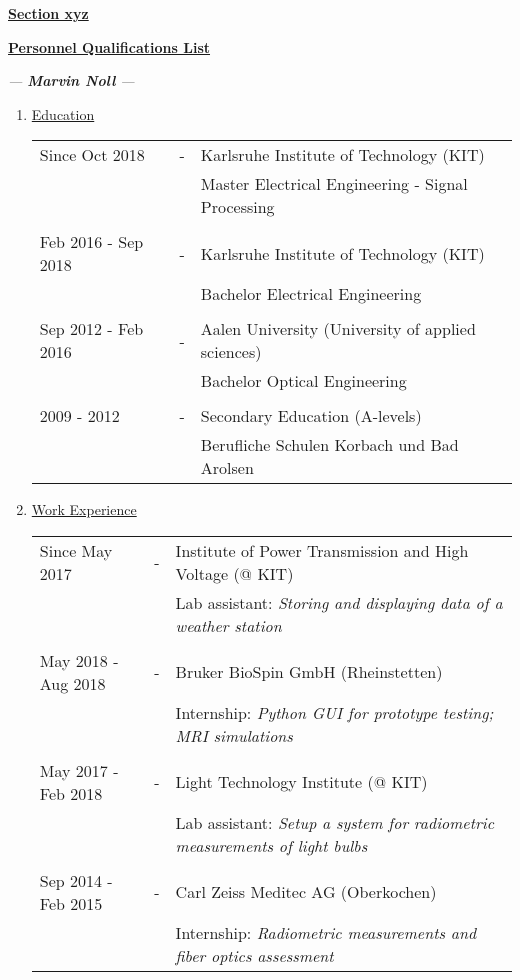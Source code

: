 \documentclass[12pt,a4paper]{scrartcl}
\begin{document}
	

\begin{center}
	\Large\textbf{\underline{Section xyz}}
	
	\vspace{0.5cm}
	
	\Large\textbf{\underline{Personnel Qualifications List}}
	
	\large \textit{--- \textbf{Marvin Noll} ---}
\end{center}


\begin{enumerate}[label=\Alph*.]
	\item \underline{Education}
	
		\begin{tabulary}{\textwidth}{@{}p{3.8cm} C L}
			Since Oct 2018 & - & Karlsruhe Institute of Technology (KIT) \\
			& & Master Electrical Engineering - Signal Processing \\
			\\[-0.5em]
			Feb 2016 - Sep 2018 & - & Karlsruhe Institute of Technology (KIT) \\
			& & Bachelor Electrical Engineering \\
			\\[-0.5em]
			Sep 2012 - Feb 2016 & - & Aalen University (University of applied sciences) \\
			& & Bachelor Optical Engineering \\
			\\[-0.5em]
			2009 - 2012 & - & Secondary Education (A-levels) \\
			& & Berufliche Schulen Korbach und Bad Arolsen \\
		\end{tabulary}
	
	\item \underline{Work Experience}
		
		\begin{tabulary}{\textwidth}{@{}p{3.8cm}CL}
			Since May 2017 & - & Institute of Power Transmission and High Voltage (@ KIT) \\
			& & Lab assistant: \textit{Storing and displaying data of a weather station}\\
			\\[-0.5em]
			May 2018 - Aug 2018 & - & Bruker BioSpin GmbH (Rheinstetten) \\
			& & Internship: \textit{Python GUI for prototype testing; MRI simulations}  \\
			\\[-0.5em]
			May 2017 - Feb 2018 & - & Light Technology Institute (@ KIT) \\
			& & Lab assistant: \textit{Setup a system for radiometric measurements of light bulbs}  \\
			\\[-0.5em]
			Sep 2014 - Feb 2015 & - & Carl Zeiss Meditec AG (Oberkochen) \\
			& & Internship: \textit{Radiometric measurements and fiber optics assessment}  \\
		\end{tabulary}
	

\end{enumerate}
\end{document}
